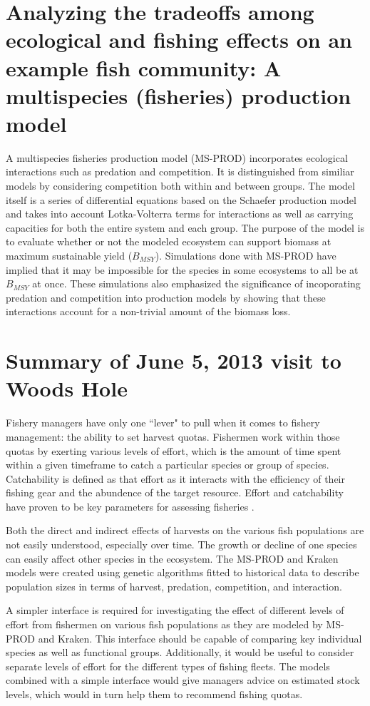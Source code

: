 \documentclass{article}
\begin{document}
\section{Analyzing the tradeoffs among ecological and fishing effects on an example fish community: A multispecies (fisheries) production model}

A multispecies fisheries production model (MS-PROD) \cite{Gamble20092570} incorporates ecological interactions such as predation and competition.  It is distinguished from similiar models by considering competition both within and between groups.  The model itself is a series of differential equations based on the Schaefer production model and takes into account Lotka-Volterra terms for interactions as well as carrying capacities for both the entire system and each group.  The purpose of the model is to evaluate whether or not the modeled ecosystem can support biomass at maximum sustainable yield ($B_{MSY}$).  Simulations done with MS-PROD have implied that it may be impossible for the species in some ecosystems to all be at $B_{MSY}$ at once.  These simulations also emphasized the significance of incoporating predation and competition into production models by showing that these interactions account for a non-trivial amount of the biomass loss.

\section{Summary of June 5, 2013 visit to Woods Hole}

Fishery managers have only one ``lever" to pull when it comes to fishery management: the ability to set harvest quotas.  Fishermen work within those quotas by exerting various levels of effort, which is the amount of time spent within a given timeframe to catch a particular species or group of species.  Catchability is defined as that effort as it interacts with the efficiency of their fishing gear and the abundence of the target resource.  Effort and catchability have proven to be key parameters for assessing fisheries \cite{ArreguinSanchez1996}. 

Both the direct and indirect effects of harvests on the various fish populations are not easily understood, especially over time.  The growth or decline of one species can easily affect other species in the ecosystem.  The MS-PROD and Kraken models were created using genetic algorithms fitted to historical data to describe population sizes in terms of harvest, predation, competition, and interaction.

A simpler interface is required for investigating the effect of different levels of effort from fishermen on various fish populations as they are modeled by MS-PROD and Kraken.  This interface should be capable of comparing key individual species as well as functional groups.  Additionally, it would be useful to consider separate levels of effort for the different types of fishing fleets.  The models combined with a simple interface would give managers advice on estimated stock levels, which would in turn help them to recommend fishing quotas.




\end{document}

